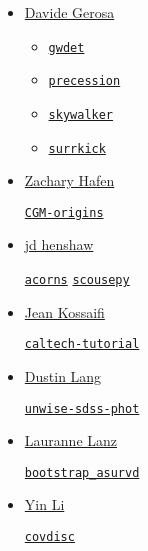 \documentclass[11pt,a4paper]{article}
\begin{document}
\begin{itemize}
\item \href{https://github.com/dgerosa/}{Davide Gerosa}
  \begin{itemize}
   \item \href{https://github.com/dgerosa/gwdet}{\tt gwdet}
   \item \href{https://github.com/dgerosa/precession}{\tt precession}
   \item \href{https://github.com/dgerosa/skywalker}{\tt skywalker}
   \item \href{https://github.com/dgerosa/surrkick}{\tt surrkick}

  \end{itemize}

\item \href{https://github.com/zhafen/}{Zachary Hafen} 
  \begin{itemize}
    \href{https://github.com/zhafen/CGM-origins}{\tt CGM-origins}
  \end{itemize}

\item \href{https://github.com/jdhenshaw}{jd henshaw}
  \begin{itemize}
    \href{https://github.com/jdhenshaw/acorns}{\tt acorns}
    \href{https://github.com/jdhenshaw/scousepy}{\tt scousepy}
  \end{itemize}

\item \href{https://github.com/JeanKossaifi}{Jean Kossaifi}
  \begin{itemize}
    \href{https://github.com/JeanKossaifi/caltech-tutorial}{{\tt caltech-tutorial}}
  \end{itemize}
  
\item \href{https://github.com/dstndstn}{Dustin Lang}
  \begin{itemize}
   \href{https://github.com/dstndstn/unwise-sdss-phot}{\tt unwise-sdss-phot}
   \end{itemize}

\item \href{https://github.com/lalanz/}{Lauranne Lanz}
  \begin{itemize}
    \href{https://github.com/lalanz/bootstrap\_asurv}{\tt bootstrap\_asurvd}
  \end{itemize}

\item \href{https://github.com/eelregit/}{Yin Li} 
  \begin{itemize}
    \href{https://github.com/eelregit/covdisc}{\tt covdisc}
  \end{itemize}


\end{itemize}
\end{document}
